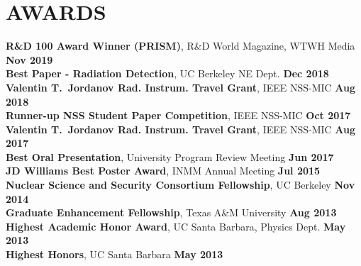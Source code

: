 \section{\small{AWARDS}}

\textbf{R\&D 100 Award Winner (PRISM)}, R\&D World Magazine, WTWH Media \hfill \textbf{Nov 2019}\\
\textbf{Best Paper - Radiation Detection}, UC Berkeley NE Dept. \hfill \textbf{Dec 2018}\\
\textbf{Valentin T.~Jordanov Rad. Instrum. Travel Grant}, IEEE NSS-MIC \hfill \textbf{Aug 2018}\\
\textbf{Runner-up NSS Student Paper Competition}, IEEE NSS-MIC \hfill \textbf{Oct 2017}\\
\textbf{Valentin T.~Jordanov Rad. Instrum. Travel Grant}, IEEE NSS-MIC \hfill \textbf{Aug 2017}\\
\textbf{Best Oral Presentation}, University Program Review Meeting \hfill \textbf{Jun 2017}\\
\textbf{JD Williams Best Poster Award}, INMM Annual Meeting \hfill \textbf{Jul 2015}\\
\textbf{Nuclear Science and Security Consortium Fellowship}, UC Berkeley \hfill \textbf{Nov 2014}\\
\textbf{Graduate Enhancement Fellowship}, Texas A\&M University \hfill \textbf{Aug 2013}\\
\textbf{Highest Academic Honor Award}, UC Santa Barbara, Physics Dept. \hfill \textbf{May 2013}\\
\textbf{Highest Honors}, UC Santa Barbara \hfill \textbf{May 2013}\\[-2.8ex]
